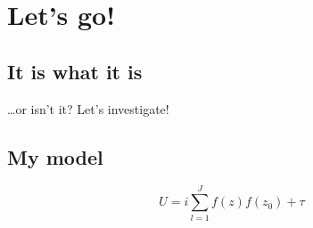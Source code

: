 
\Clear
\chapter{Let's go!}

\section{It is what it is}
\dots or isn't it? Let's investigate!

\begin{subappendices}
	
\section{My model}
\label{sub:my_model}

%
\begin{equation}
	U = i \sum_{l=1}^{J} f(z)f(z_0) + \tau
\end{equation}
%

\end{subappendices}

